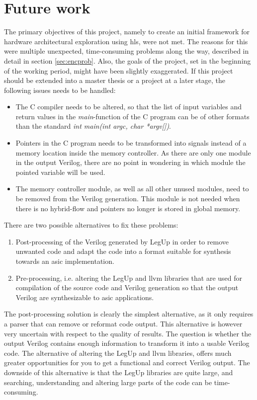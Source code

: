 \chapter{Future work}
\label{chp:futurework} 
The primary objectives of this project, namely to create an initial framework for hardware architectural exploration using \gls{hls}, were not met. The reasons for this were multiple unexpected, time-consuming problems along the way, described in detail in section \ref{sec:encprob}. Also, the goals of the project, set in the beginning of the working period, might have been slightly exaggerated.
If this project should be extended into a master thesis or a project at a later stage, the following issues needs to be handled:
\begin{itemize}
\item The C compiler needs to be altered, so that the list of input variables and return values in the \textit{main}-function of the C program can be of other formats than the standard \textit{int main(int argc, char *argv[])}.
\item Pointers in the C program needs to be transformed into signals instead of a memory location inside the memory controller. As there are only one module in the output Verilog, there are no point in wondering in which module the pointed variable will be used. 
\item The memory controller module, as well as all other unused modules, need to be removed from the Verilog generation. This module is not needed when there is no hybrid-flow and pointers no longer is stored in global memory.
\end{itemize}

There are two possible alternatives to fix these problems:
\begin{enumerate}
\item Post-processing of the Verilog generated by LegUp in order to remove unwanted code and adapt the code into a format suitable for synthesis towards an \gls{asic} implementation.
\item Pre-processing, i.e. altering the LegUp and \gls{llvm} libraries that are used for compilation of the source code and Verilog generation so that the output Verilog are synthesizable to \gls{asic} applications.
\end{enumerate}

The post-processing solution is clearly the simplest alternative, as it only requires a parser that can remove or reformat code output. This alternative is however very uncertain with respect to the quality of results. The question is whether the output Verilog contains enough information to transform it into a usable Verilog code.
The alternative of altering the LegUp and \gls{llvm} libraries, offers much greater opportunities for you to get a functional and correct Verilog output. The downside of this alternative is that the LegUp libraries are quite large, and searching, understanding and altering large parts of the code can be time-consuming. 

